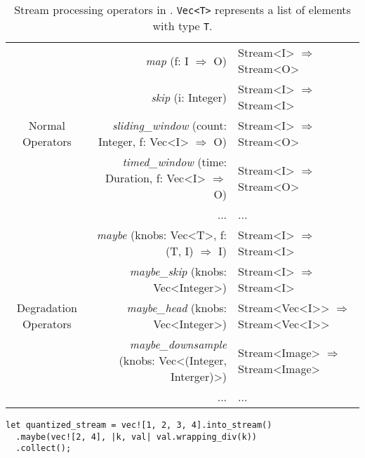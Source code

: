 \begin{table*}
  \footnotesize
  \centering
  \begin{tabular}{ c r l }
    \toprule
    \multirow{5}{*}{Normal Operators}
    & \textit{map} (f: I $\Rightarrow$ O) & Stream<I> $\Rightarrow$ Stream<O> \\
    & \textit{skip} (i: Integer) & Stream<I> $\Rightarrow$
                                   Stream<I> \\
    & \textit{sliding\_window} (count: Integer, f: Vec<I> $\Rightarrow$ O) & Stream<I> $\Rightarrow$
                                                                            Stream<O> \\
    & \textit{timed\_window} (time: Duration, f: Vec<I> $\Rightarrow$ O) & Stream<I> $\Rightarrow$
                                                                          Stream<O> \\
    & ... & ... \\
    \midrule
    \multirow{5}{*}{Degradation Operators}
    & \textit{maybe} (knobs: Vec<T>, f:  (T, I) $\Rightarrow$ I) & Stream<I> $\Rightarrow$
                                                                 Stream<I> \\
    & \textit{maybe\_skip} (knobs: Vec<Integer>) & Stream<I> $\Rightarrow$ Stream<I> \\
    & \textit{maybe\_head} (knobs: Vec<Integer>) & Stream<Vec<I>{}> $\Rightarrow$
                                                   Stream<Vec<I>{}> \\
    & \textit{maybe\_downsample} (knobs: Vec<(Integer, Interger)>) & Stream<Image> $\Rightarrow$ Stream<Image> \\
    & ... & ... \\
    \bottomrule
  \end{tabular}
  \caption{Stream processing operators in \sysname{}. \texttt{Vec<T>} represents
    a list of elements with type \texttt{T}.}
  \label{tab:operators}
\end{table*}

\vspace{-2pt}
\begin{lstlisting}
let quantized_stream = vec![1, 2, 3, 4].into_stream()
  .maybe(vec![2, 4], |k, val| val.wrapping_div(k))
  .collect();
\end{lstlisting}

